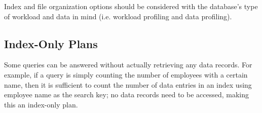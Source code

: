 \documentclass[12pt,titlepage]{article}
\begin{document}
      Index and file organization options should be considered with the database's type of workload and data in mind (i.e. workload profiling and
      data profiling).

    \subsection{Index-Only Plans}
      Some queries can be answered without actually retrieving any data records. For example, if a query is simply counting the number of employees
      with a certain name, then it is sufficient to count the number of data entries in an index using employee name as the search key; no data records
      need to be accessed, making this an index-only plan.
\end{document}
